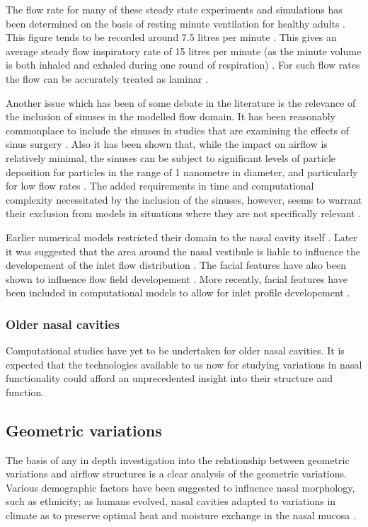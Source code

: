 The flow rate for many of these steady state experiments and simulations has been determined on the basis of resting minute ventilation for healthy adults \cite{Subramaniam1998, Wen2008}. This figure tends to be recorded around 7.5 litres per minute \cite{Chaya2006, Tobin1983}. This gives an average steady flow inspiratory rate of 15 litres per minute (as the minute volume is both inhaled and exhaled during one round of respiration) \cite{Subramaniam1998}. For such flow rates the flow can be accurately treated as laminar \cite{Doorly2008c, Hahn1993}.


Another issue which has been of some debate in the literature is the relevance of the inclusion of sinuses in the modelled flow domain. It has been reasonably commonplace to include the sinuses in studies that are examining the effects of sinus surgery \cite{Xiong2008a, Lindemann2005}. Also it has been shown that, while the impact on airflow is relatively minimal, the sinuses can be subject to significant levels of particle deposition for particles in the range of 1 nanometre in diameter, and particularly for low flow rates \cite{Ge2012}. The added requirements in time and computational complexity necessitated by the inclusion of the sinuses, however, seems to warrant their exclusion from models in situations where they are not specifically relevant \cite{Doorly2008c}.


Earlier numerical models restricted their domain to the nasal cavity itself \cite{Keyhani1995, Subramaniam1998, Wen2008}. Later it was suggested that the area around the nasal vestibule is liable to influence the developement of the inlet flow distribution \cite{Doorly2008}. The facial features have also been shown to influence flow field developement \cite{Anthony2005}. More recently, facial features have been included in computational models to allow for inlet profile developement \cite{Li2012, Lee2010}.


\subsubsection*{Older nasal cavities}
Computational studies have yet to be undertaken for older nasal cavities. It is expected that the technologies available to us now for studying variations in nasal functionality could afford an unprecedented insight into their structure and function.

\subsection{Geometric variations}
The basis of any in depth investigation into the relationship between geometric variations and airflow structures is a clear analysis of the geometric variations. Various demographic factors have been suggested to influence nasal morphology, such as ethnicity; as humans evolved, nasal cavities adapted to variations in climate as to preserve optimal heat and moisture exchange in the nasal mucosa \cite{Davies1932, Thomson1923, Weiner1954, Churchill2004, Noback2011}.


